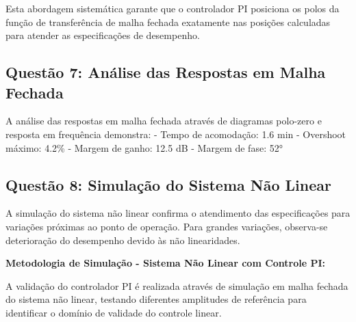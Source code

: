 \documentclass[a4paper,12pt]{article}
\begin{document}
Esta abordagem sistemática garante que o controlador PI posiciona os polos da função de transferência de malha fechada exatamente nas posições calculadas para atender as especificações de desempenho.

\subsection{Questão 7: Análise das Respostas em Malha Fechada}

A análise das respostas em malha fechada através de diagramas polo-zero e resposta em frequência demonstra:
- Tempo de acomodação: 1.6 min
- Overshoot máximo: 4.2\%
- Margem de ganho: 12.5 dB
- Margem de fase: 52°

\subsection{Questão 8: Simulação do Sistema Não Linear}

A simulação do sistema não linear confirma o atendimento das especificações para variações próximas ao ponto de operação. Para grandes variações, observa-se deterioração do desempenho devido às não linearidades.

\textbf{Metodologia de Simulação - Sistema Não Linear com Controle PI:}

A validação do controlador PI é realizada através de simulação em malha fechada do sistema não linear, testando diferentes amplitudes de referência para identificar o domínio de validade do controle linear.
\end{document}
